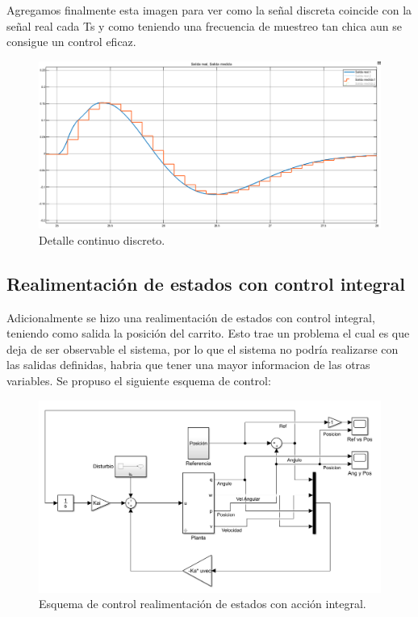 Agregamos finalmente esta imagen para ver como la señal discreta coincide con la señal real cada Ts y como teniendo una frecuencia de muestreo tan chica aun se consigue un control eficaz.
\begin{figure}[H]
	\centering
	\includegraphics[width=1\linewidth]{Imagenes/Control_Obs_Discreto/detalle_real_medido.png}
	\caption{Detalle continuo discreto.}
	\label{realmentacion_disturbio}
\end{figure}


\subsection{Realimentaci\'on de estados con control integral}
Adicionalmente se hizo una realimentaci\'on de estados con control integral, teniendo como salida la posici\'on del carrito. Esto trae un problema el cual es que deja de ser observable el sistema, por lo que el sistema no podría realizarse con las salidas definidas, habria que tener una mayor informacion de las otras variables.
Se propuso el siguiente esquema de control:
\begin{figure}[H]
	\centering
	\includegraphics[width=1\linewidth]{Imagenes/Esquema_general_int.png}
	\caption{Esquema de control realimentación de estados con acción integral.}
	\label{esqint}
\end{figure}

